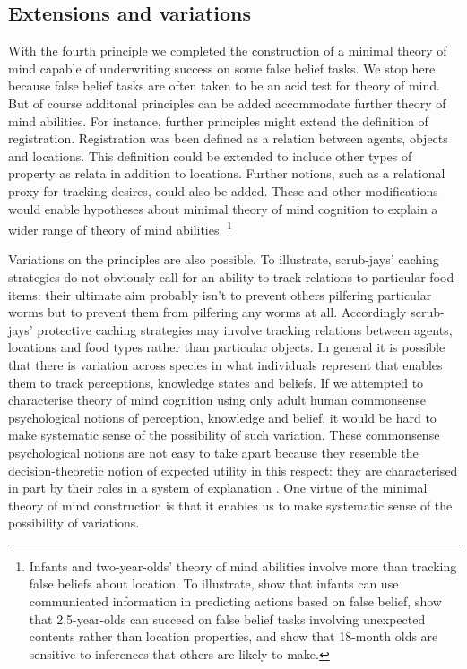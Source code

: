 \documentclass[12pt,\papersize]{extarticle}
\begin{document}
\subsection{Extensions and variations}
With the fourth principle we completed the construction of a minimal theory of mind capable of underwriting success on some false belief tasks.  
We stop here because false belief tasks are often taken to be an acid test for theory of mind.
But of course additonal principles can be added accommodate further theory of mind abilities.  
For instance, further principles might extend the definition of registration.  
Registration was been defined as a relation between agents, objects and locations. 
This definition could be extended to include  other types of property as relata in addition to locations.  
Further notions, such as a relational proxy for tracking desires, could also be added.  
These and other modifications would enable hypotheses about minimal theory of mind cognition  to explain a wider range of theory of mind abilities.%
\footnote{
Infants and two-year-olds' theory of mind abilities involve more than tracking false beliefs about location.
To illustrate, \citet{en_1691} show that infants can use communicated information in predicting actions based on false belief, 
\citet{he:2011_false}  show that 2.5-year-olds can succeed on false belief tasks involving unexpected contents rather than location properties, 
and  \citet{en_1795}  show that 18-month olds are sensitive to inferences that others are likely to make. 
}


Variations on the principles are also possible.  To illustrate, scrub-jays’ caching strategies do not obviously call for an ability to track relations to particular food items: their ultimate aim probably isn’t to prevent others pilfering particular worms but to prevent them from pilfering any worms at all.  Accordingly scrub-jays’ protective caching strategies may involve tracking relations between agents, locations and food types rather than particular objects.  
In general it is possible that there is variation across species in what individuals represent that enables them to track perceptions, knowledge states and beliefs. 
If we attempted to characterise theory of mind cognition using only adult human commonsense psychological notions of perception, knowledge and belief, it would be hard to make systematic  sense of the possibility of such variation.
These commonsense psychological notions are not easy to take apart because they resemble the decision-theoretic notion of expected utility in this respect: they are characterised in part by their roles in a system of explanation \citep{Davidson:1985qg,Davidson:1999ju}.
One virtue of the minimal theory of mind construction is that it enables us to make systematic sense of the possibility of variations. 
\end{document}
